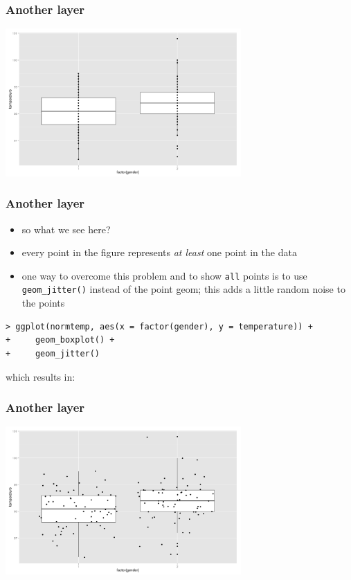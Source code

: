 \documentclass[xcolor={table}]{beamer}
\begin{document}
\begin{frame}\frametitle{Another layer}
  \begin{center}
    \includegraphics[width=9cm]{boxplotpoint.png}
  \end{center}
\end{frame}

\begin{frame}[fragile]\frametitle{Another layer}
  \begin{itemize}
  \item so what we see here?
  \item every point in the figure represents \textit{at least} one point in the data
  \item one way to overcome this problem and to show \texttt{all} points is to use \texttt{geom\_jitter()} instead of the point geom; this adds a little random noise to the points
  \end{itemize}\small
\begin{verbatim}
> ggplot(normtemp, aes(x = factor(gender), y = temperature)) +
+     geom_boxplot() +
+     geom_jitter()  
\end{verbatim}
which results in:
\end{frame}

\begin{frame}\frametitle{Another layer}
  \begin{center}
    \includegraphics[width=9cm]{boxplotjitter.png}
  \end{center}
\end{frame}
\end{document}
